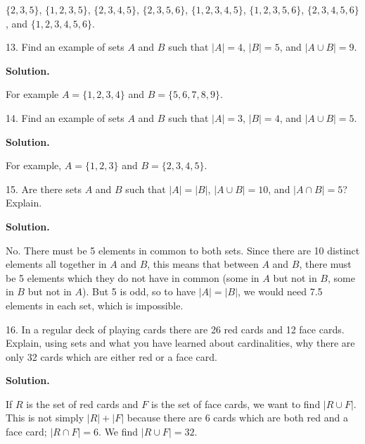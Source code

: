 \documentclass[10pt,]{book}
\theoremstyle{plain}
\theoremstyle{definition}
\theoremstyle{definition}
\theoremstyle{definition}
\numberwithin{equation}{section}
\begin{document}
\begin{exerciselist}
            \(\{2,3,5\}\), \(\{1,2,3,5\}\), \(\{2,3,4,5\}\), \(\{2,3,5,6\}\), \(\{1,2,3,4,5\}\), \(\{1,2,3,5,6\}\), \(\{2,3,4,5,6\}\), and \(\{1,2,3,4,5,6\}\).
\item[13.]\hypertarget{exercise-23}{}
            Find an example of sets \(A\) and \(B\) such that \(|A| = 4\), \(|B| = 5\), and \(|A \cup B| = 9\).
\par\smallskip
\par\smallskip
\noindent\textbf{Solution.}\hypertarget{solution-35}{}\quad

            For example \(A = \{1,2,3,4\}\) and \(B = \{5,6,7,8,9\}\).
\item[14.]\hypertarget{exercise-24}{}
            Find an example of sets \(A\) and \(B\) such that \(|A| = 3\), \(|B| = 4\), and \(|A \cup B| = 5\).
\par\smallskip
\par\smallskip
\noindent\textbf{Solution.}\hypertarget{solution-36}{}\quad

            For example, \(A = \{1,2,3\}\) and \(B = \{2,3,4,5\}\).
\item[15.]\hypertarget{exercise-25}{}
            Are there sets \(A\) and \(B\) such that \(|A| = |B|\), \(|A\cup B| = 10\), and \(|A\cap B| = 5\)? Explain.
\par\smallskip
\par\smallskip
\noindent\textbf{Solution.}\hypertarget{solution-37}{}\quad

            No. There must be 5 elements in common to both sets. Since there are 10 distinct elements all together in \(A\) and \(B\), this means that between \(A\) and \(B\), there must be 5 elements which they do not have in common (some in \(A\) but not in \(B\), some in \(B\) but not in \(A\)). But 5 is odd, so to have \(|A| = |B|\), we would need 7.5 elements in each set, which is impossible.
\item[16.]\hypertarget{exercise-26}{}
            In a regular deck of playing cards there are 26 red cards and 12 face cards. Explain, using sets and what you have learned about cardinalities, why there are only 32 cards which are either red or a face card.
\par\smallskip
\par\smallskip
\noindent\textbf{Solution.}\hypertarget{solution-38}{}\quad

            If \(R\) is the set of red cards and \(F\) is the set of face cards, we want to find \(|R \cup F|\). This is not simply \(|R| + |F|\) because there are 6 cards which are both red and a face card; \(|R \cap F| = 6\). We find
            \(|R \cup F| = 32\).
\end{exerciselist}
\typeout{************************************************}
\typeout{************************************************}
\end{document}
